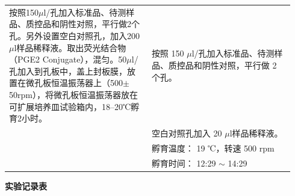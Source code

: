 \documentclass[UTF8,10pt,a4paper,fontset=fandol]{ctexart}
\newcommand{\fieldvalue}[1]{#1}
\newcommand{\handwritten}[1]{#1}
\begin{document}
\begin{tabular}{|p{0.47\linewidth}|p{0.47\linewidth}|}
按照150$\mu$l/孔加入标准品、待测样品、质控品和阴性对照，平行做2个孔。另外设置空白对照孔，加入200$\mu$l样品稀释液。取出荧光结合物（PGE2 Conjugate），混匀。50$\mu$l/孔加入到孔板中，盖上封板膜，放置在微孔板恒温振荡器上（500$\pm$50rpm），将微孔板恒温振荡器放在可扩展培养皿试验箱内，18--20℃孵育2小时。 &
按照
\fieldvalue{\handwritten{150}} $\mu$l/孔加入标准品、待测样品、质控品和阴性对照，平行做
\fieldvalue{\handwritten{2}} 个孔。\\
&
空白对照孔加入
\fieldvalue{\handwritten{20}} $\mu$l样品稀释液。\\
&
孵育温度：
\fieldvalue{\handwritten{19}} ℃，转速
\fieldvalue{\handwritten{500}} rpm\\
&
孵育时间：
\fieldvalue{\handwritten{12:29}} $\sim$
\fieldvalue{\handwritten{14:29}} \\
\hline
\end{tabular}


\newpage

\begin{center}
\textbf{实验记录表}
\end{center}
\end{document}
